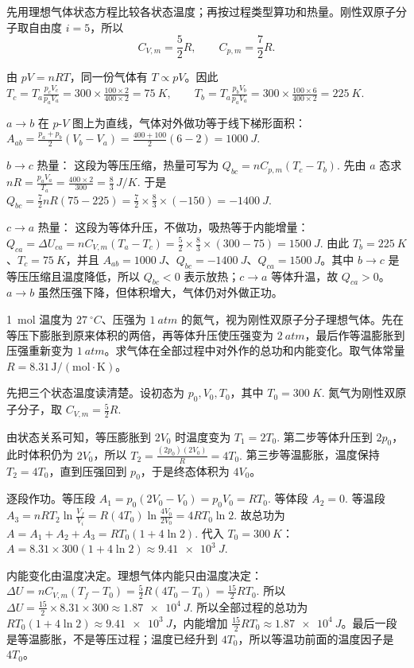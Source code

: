 \documentclass[lang=cn,11pt]{elegantbook}
\begin{document}
\begin{solution}
先用理想气体状态方程比较各状态温度；再按过程类型算功和热量。刚性双原子分子取自由度 \(i=5\)，所以
\[
C_{V,m}=\frac52R,\qquad C_{p,m}=\frac72R.
\]

由 \(pV=nRT\)，同一份气体有 \(T\propto pV\)。因此
 \(T_c=T_a\frac{p_cV_c}{p_aV_a} =300\times\frac{100\times2}{400\times2} =\SI{75}{K},\qquad T_b=T_a\frac{p_bV_b}{p_aV_a} =300\times\frac{100\times6}{400\times2} =\SI{225}{K}.\) 

\(a\to b\) 在 \(p\)-\(V\) 图上为直线，气体对外做功等于线下梯形面积：
 \(A_{ab}=\frac{p_a+p_b}{2}(V_b-V_a) =\frac{400+100}{2}(6-2) =\SI{1000}{J}.\) 

\(b\to c\) 热量： 这段为等压压缩，热量可写为
 \(Q_{bc}=nC_{p,m}(T_c-T_b).\) 
先由 \(a\) 态求
 \(nR=\frac{p_aV_a}{T_a} =\frac{400\times2}{300} =\frac83\,\si{J/K}.\) 
于是
 \(Q_{bc}=\frac72nR(75-225) =\frac72\times\frac83\times(-150) =\SI{-1400}{J}.\) 

\(c\to a\) 热量： 这段为等体升压，不做功，吸热等于内能增量：
 \(Q_{ca}=\Delta U_{ca}=nC_{V,m}(T_a-T_c) =\frac52\times\frac83\times(300-75) =\SI{1500}{J}.\) 
由此 \(T_b=\SI{225}{K}\)、\(T_c=\SI{75}{K}\)，并且 \(A_{ab}=\SI{1000}{J}\)、\(Q_{bc}=\SI{-1400}{J}\)、\(Q_{ca}=\SI{1500}{J}\)。其中 \(b\to c\) 是等压压缩且温度降低，所以 \(Q_{bc}<0\) 表示放热；\(c\to a\) 等体升温，故 \(Q_{ca}>0\)。\(a\to b\) 虽然压强下降，但体积增大，气体仍对外做正功。
\end{solution}

\begin{exercise}
\SI{1}{mol} 温度为 \(\SI{27}{^\circ C}\)、压强为 \(\SI{1}{atm}\) 的氮气，视为刚性双原子分子理想气体。先在等压下膨胀到原来体积的两倍，再等体升压使压强变为 \(\SI{2}{atm}\)，最后作等温膨胀到压强重新变为 \(\SI{1}{atm}\)。求气体在全部过程中对外作的总功和内能变化。取气体常量 \(R=8.31\,\mathrm{J/(mol\cdot K)}\)。
\end{exercise}

\begin{solution}
先把三个状态温度读清楚。设初态为 \(p_0,V_0,T_0\)，其中
 \(T_0=\SI{300}{K}.\) 
氮气为刚性双原子分子，取
 \(C_{V,m}=\frac52R.\) 

由状态关系可知，等压膨胀到 \(2V_0\) 时温度变为
 \(T_1=2T_0.\) 
第二步等体升压到 \(2p_0\)，此时体积仍为 \(2V_0\)，所以
 \(T_2=\frac{(2p_0)(2V_0)}{R}=4T_0.\) 
第三步等温膨胀，温度保持 \(T_2=4T_0\)，直到压强回到 \(p_0\)，于是终态体积为 \(4V_0\)。

逐段作功。等压段
 \(A_1=p_0(2V_0-V_0)=p_0V_0=RT_0.\) 
等体段
 \(A_2=0.\) 
等温段
 \(A_3=nRT_2\ln\frac{V_f}{V_i} =R(4T_0)\ln\frac{4V_0}{2V_0} =4RT_0\ln2.\) 
故总功为
 \(A=A_1+A_2+A_3 =RT_0(1+4\ln2).\) 
代入 \(T_0=\SI{300}{K}\)：
 \(A=8.31\times300(1+4\ln2) \approx \SI{9.41e3}{J}.\) 

内能变化由温度决定。理想气体内能只由温度决定：
 \(\Delta U=nC_{V,m}(T_f-T_0) =\frac52R(4T_0-T_0) =\frac{15}{2}RT_0.\) 
所以
 \(\Delta U=\frac{15}{2}\times8.31\times300 \approx \SI{1.87e4}{J}.\) 
所以全部过程的总功为 \(RT_0(1+4\ln2)\approx\SI{9.41e3}{J}\)，内能增加 \(\frac{15}{2}RT_0\approx\SI{1.87e4}{J}\)。最后一段是等温膨胀，不是等压过程；温度已经升到 \(4T_0\)，所以等温功前面的温度因子是 \(4T_0\)。
\end{solution}
\end{document}
